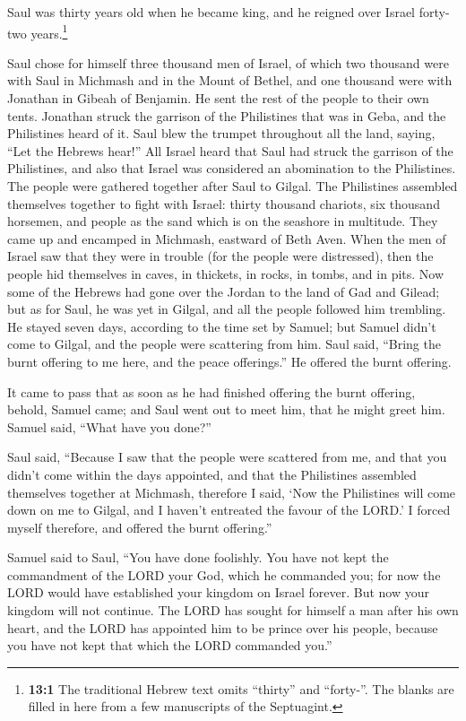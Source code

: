  Saul was thirty years old when he became king, and he
reigned over Israel forty-two years.\footnote{\textbf{13:1} The
  traditional Hebrew text omits ``thirty'' and ``forty-''. The blanks
  are filled in here from a few manuscripts of the Septuagint.}

 Saul chose for himself three thousand men of Israel, of
which two thousand were with Saul in Michmash and in the Mount of
Bethel, and one thousand were with Jonathan in Gibeah of Benjamin. He
sent the rest of the people to their own tents.  Jonathan
struck the garrison of the Philistines that was in Geba, and the
Philistines heard of it. Saul blew the trumpet throughout all the land,
saying, ``Let the Hebrews hear!''  All Israel heard that
Saul had struck the garrison of the Philistines, and also that Israel
was considered an abomination to the Philistines. The people were
gathered together after Saul to Gilgal.  The Philistines
assembled themselves together to fight with Israel: thirty thousand
chariots, six thousand horsemen, and people as the sand which is on the
seashore in multitude. They came up and encamped in Michmash, eastward
of Beth Aven.  When the men of Israel saw that they were
in trouble (for the people were distressed), then the people hid
themselves in caves, in thickets, in rocks, in tombs, and in pits.
 Now some of the Hebrews had gone over the Jordan to the
land of Gad and Gilead; but as for Saul, he was yet in Gilgal, and all
the people followed him trembling.  He stayed seven days,
according to the time set by Samuel; but Samuel didn't come to Gilgal,
and the people were scattering from him.  Saul said,
``Bring the burnt offering to me here, and the peace offerings.'' He
offered the burnt offering.

 It came to pass that as soon as he had finished offering
the burnt offering, behold, Samuel came; and Saul went out to meet him,
that he might greet him.  Samuel said, ``What have you
done?''

Saul said, ``Because I saw that the people were scattered from me, and
that you didn't come within the days appointed, and that the Philistines
assembled themselves together at Michmash,  therefore I
said, `Now the Philistines will come down on me to Gilgal, and I haven't
entreated the favour of the LORD.' I forced myself therefore, and
offered the burnt offering.''

 Samuel said to Saul, ``You have done foolishly. You have
not kept the commandment of the LORD your God, which he commanded you;
for now the LORD would have established your kingdom on Israel forever.
 But now your kingdom will not continue. The LORD has
sought for himself a man after his own heart, and the LORD has appointed
him to be prince over his people, because you have not kept that which
the LORD commanded you.''

